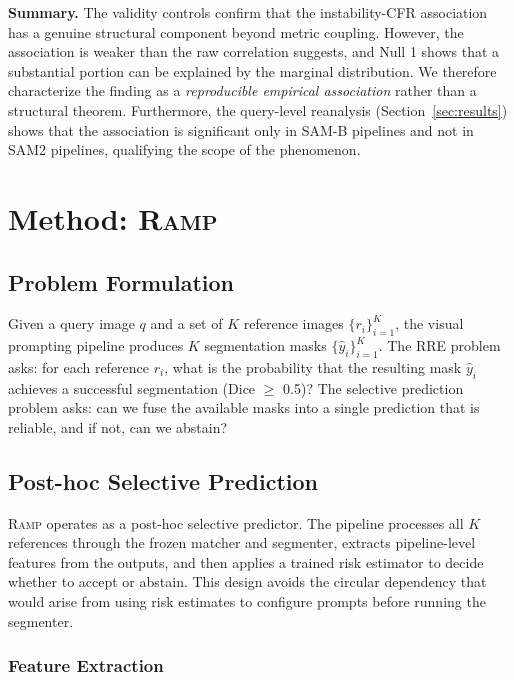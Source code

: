 \documentclass[11pt]{article}
\newcommand{\RAMP}{\textsc{Ramp}}
\begin{document}
\medskip\noindent
\textbf{Summary.} The validity controls confirm that the instability-CFR
association has a genuine structural component beyond metric coupling.
However, the association is weaker than the raw correlation suggests, and
Null 1 shows that a substantial portion can be explained by the marginal
distribution. We therefore characterize the finding as a \emph{reproducible
empirical association} rather than a structural theorem. Furthermore, the
query-level reanalysis (Section~\ref{sec:results}) shows that the
association is significant only in SAM-B pipelines and not in SAM2
pipelines, qualifying the scope of the phenomenon.

\section{Method: \RAMP}
\label{sec:method}

\subsection{Problem Formulation}

Given a query image $q$ and a set of $K$ reference images $\{r_i\}_{i=1}^K$,
the visual prompting pipeline produces $K$ segmentation masks
$\{\hat{y}_i\}_{i=1}^K$. The RRE problem asks: for each reference $r_i$,
what is the probability that the resulting mask $\hat{y}_i$ achieves a
successful segmentation (Dice $\geq$ 0.5)? The selective prediction problem
asks: can we fuse the available masks into a single prediction that is
reliable, and if not, can we abstain?

\subsection{Post-hoc Selective Prediction}

\RAMP{} operates as a post-hoc selective predictor. The pipeline processes
all $K$ references through the frozen matcher and segmenter, extracts
pipeline-level features from the outputs, and then applies a trained risk
estimator to decide whether to accept or abstain. This design avoids the
circular dependency that would arise from using risk estimates to configure
prompts before running the segmenter.

\subsubsection{Feature Extraction}
\end{document}
